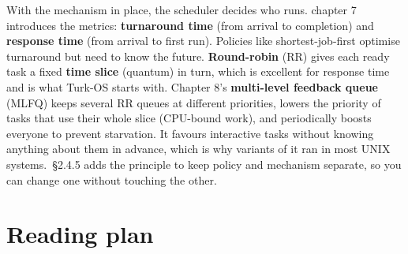 \documentclass[11pt,a4paper]{article}
\begin{document}
With the mechanism in place, the scheduler decides who runs. \OSTEP chapter 7 introduces the metrics:
\textbf{turnaround time} (from arrival to completion) and \textbf{response time} (from arrival to first run). Policies
like shortest-job-first optimise turnaround but need to know the future. \textbf{Round-robin} (RR) gives each ready
task a fixed \textbf{time slice} (quantum) in turn, which is excellent for response time and is what Turk-OS starts
with. Chapter 8's \textbf{multi-level feedback queue} (MLFQ) keeps several RR queues at different priorities, lowers
the priority of tasks that use their whole slice (CPU-bound work), and periodically boosts everyone to prevent
starvation. It favours interactive tasks without knowing anything about them in advance, which is why variants of it
ran in most UNIX systems. \OSDI\,\S2.4.5 adds the principle to keep policy and mechanism separate, so you can change
one without touching the other.

\section{Reading plan}
\end{document}
